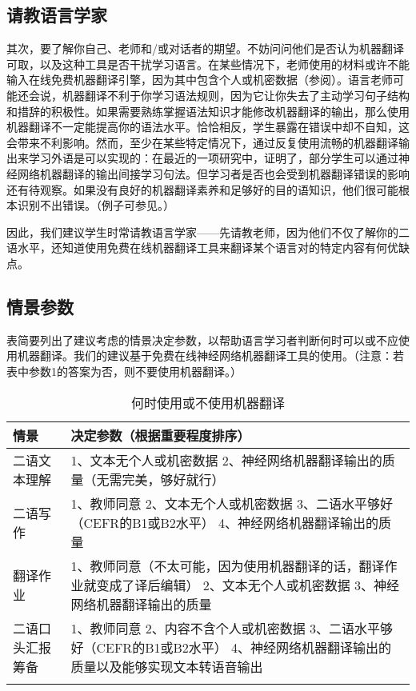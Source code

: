 \documentclass[output=paper,colorlinks,citecolor=brown]{langscibook}
\begin{document}
\subsection{请教语言学家}
其次，要了解你自己、老师和/或对话者的期望。不妨问问他们是否认为机器翻译可取，以及这种工具是否干扰学习语言。在某些情况下，老师使用的材料或许不能输入在线免费机器翻译引擎，因为其中包含个人或机密数据（参阅）。语言老师可能还会说，机器翻译不利于你学习语法规则，因为它让你失去了主动学习句子结构和措辞的积极性。如果需要熟练掌握语法知识才能修改机器翻译的输出，那么使用机器翻译不一定能提高你的语法水平。恰恰相反，学生暴露在错误中却不自知，这会带来不利影响。然而，至少在某些特定情况下，通过反复使用流畅的机器翻译输出来学习外语是可以实现的：在最近的一项研究中，\citet{ResendeWay2021}证明了，部分学生可以通过神经网络机器翻译的输出间接学习句法。但学习者是否也会受到机器翻译错误的影响还有待观察。如果没有良好的机器翻译素养和足够好的目的语知识，他们很可能根本识别不出错误。（例子可参见\citealt{LoockLéchauguette2021}。）

因此，我们建议学生时常请教语言学家——先请教老师，因为他们不仅了解你的二语水平，还知道使用免费在线机器翻译工具来翻译某个语言对的特定内容有何优缺点。


\subsection{情景参数}
表简要列出了建议考虑的情景决定参数，以帮助语言学习者判断何时可以或不应使用机器翻译。我们的建议基于免费在线神经网络机器翻译工具的使用。（注意：若表中参数1的答案为否，则不要使用机器翻译。）

\begin{table}
\begin{tabularx}{\textwidth}{QQ}
\lsptoprule
{情景} & {决定参数（根据重要程度排序）}\\
\midrule
二语文本理解 & 1、文本无个人或机密数据
2、神经网络机器翻译输出的质量（无需完美，够好就行）\\
\tablevspace

二语写作 & 1、教师同意
2、文本无个人或机密数据
3、二语水平够好（CEFR的B1或B2水平）
4、神经网络机器翻译输出的质量\\
\tablevspace

翻译作业 & 1、教师同意（不太可能，因为使用机器翻译的话，翻译作业就变成了译后编辑）
2、文本无个人或机密数据
3、神经网络机器翻译输出的质量\\
\tablevspace

二语口头汇报筹备 & 1、教师同意
2、内容不含个人或机密数据
3、二语水平够好（CEFR的B1或B2水平）
4、神经网络机器翻译输出的质量以及能够实现文本转语音输出\\
\lspbottomrule
\end{tabularx}
\caption{何时使用或不使用机器翻译}
\label{tab:carre:1}
\end{table}
\end{document}
